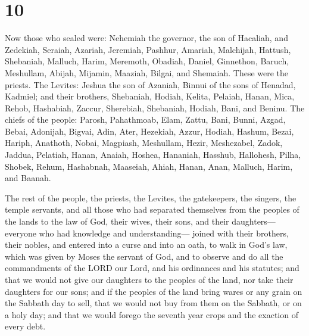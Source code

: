\hypertarget{section-9}{%
\section{10}\label{section-9}}

 Now those who sealed were: Nehemiah the governor, the son
of Hacaliah, and Zedekiah,  Seraiah, Azariah, Jeremiah,
 Pashhur, Amariah, Malchijah,  Hattush,
Shebaniah, Malluch,  Harim, Meremoth, Obadiah,
 Daniel, Ginnethon, Baruch,  Meshullam,
Abijah, Mijamin,  Maaziah, Bilgai, and Shemaiah. These
were the priests.  The Levites: Jeshua the son of Azaniah,
Binnui of the sons of Henadad, Kadmiel;  and their
brothers, Shebaniah, Hodiah, Kelita, Pelaiah, Hanan, 
Mica, Rehob, Hashabiah,  Zaccur, Sherebiah, Shebaniah,
 Hodiah, Bani, and Beninu.  The chiefs of
the people: Parosh, Pahathmoab, Elam, Zattu, Bani, 
Bunni, Azgad, Bebai,  Adonijah, Bigvai, Adin,
 Ater, Hezekiah, Azzur,  Hodiah, Hashum,
Bezai,  Hariph, Anathoth, Nobai, 
Magpiash, Meshullam, Hezir,  Meshezabel, Zadok, Jaddua,
 Pelatiah, Hanan, Anaiah,  Hoshea,
Hananiah, Hasshub,  Hallohesh, Pilha, Shobek,
 Rehum, Hashabnah, Maaseiah,  Ahiah,
Hanan, Anan,  Malluch, Harim, and Baanah.

 The rest of the people, the priests, the Levites, the
gatekeepers, the singers, the temple servants, and all those who had
separated themselves from the peoples of the lands to the law of God,
their wives, their sons, and their daughters---everyone who had
knowledge and understanding---  joined with their
brothers, their nobles, and entered into a curse and into an oath, to
walk in God's law, which was given by Moses the servant of God, and to
observe and do all the commandments of the LORD our Lord, and his
ordinances and his statutes;  and that we would not give
our daughters to the peoples of the land, nor take their daughters for
our sons;  and if the peoples of the land bring wares or
any grain on the Sabbath day to sell, that we would not buy from them on
the Sabbath, or on a holy day; and that we would forego the seventh year
crops and the exaction of every debt.

